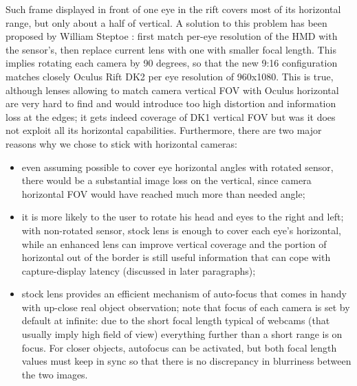 Such frame displayed in front of one eye in the rift covers most of its horizontal range, but only about a half of vertical. A solution to this problem has been proposed by William Steptoe \cite{ar_rift}: first match per-eye resolution of the HMD with the sensor's, then replace current lens with one with smaller focal length. This implies rotating each camera by 90 degrees, so that the new 9:16 configuration matches closely Oculus Rift DK2 per eye resolution of 960x1080. This is true, although lenses allowing to match camera vertical FOV with Oculus horizontal are very hard to find and would introduce too high distortion and information loss at the edges; it gets indeed coverage of DK1 vertical FOV but was it does not exploit all its horizontal capabilities. Furthermore, there are two major reasons why we chose to stick with horizontal cameras:
\begin{itemize}
\item even assuming possible to cover eye horizontal angles with rotated sensor, there would be a substantial image loss on the vertical, since camera horizontal FOV would have reached much more than needed angle;
\item it is more likely to the user to rotate his head and eyes to the right and left; with non-rotated sensor, stock lens is enough to cover each eye's horizontal, while an enhanced lens can improve vertical coverage and the portion of horizontal out of the border is still useful information that can cope with capture-display latency (discussed in later paragraphs);
\item stock lens provides an efficient mechanism of auto-focus that comes in handy with up-close real object observation; note that focus of each camera is set by default at infinite: due to the short focal length typical of webcams (that usually imply high field of view) everything further than a short range is on focus. For closer objects, autofocus can be activated, but both focal length values must keep in sync so that there is no discrepancy in blurriness between the two images.
\end{itemize}

